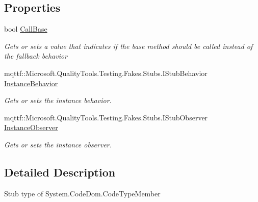 \subsection*{Properties}
\begin{DoxyCompactItemize}
\item 
bool \hyperlink{class_system_1_1_code_dom_1_1_fakes_1_1_stub_code_type_member_ad26ded313c73bfee43b33c5ba523671c}{Call\-Base}
\begin{DoxyCompactList}\small\item\em Gets or sets a value that indicates if the base method should be called instead of the fallback behavior\end{DoxyCompactList}\item 
mqttf\-::\-Microsoft.\-Quality\-Tools.\-Testing.\-Fakes.\-Stubs.\-I\-Stub\-Behavior \hyperlink{class_system_1_1_code_dom_1_1_fakes_1_1_stub_code_type_member_ace01653f0898203c907d35e0021ce587}{Instance\-Behavior}
\begin{DoxyCompactList}\small\item\em Gets or sets the instance behavior.\end{DoxyCompactList}\item 
mqttf\-::\-Microsoft.\-Quality\-Tools.\-Testing.\-Fakes.\-Stubs.\-I\-Stub\-Observer \hyperlink{class_system_1_1_code_dom_1_1_fakes_1_1_stub_code_type_member_a10c02c633674a6d8b1b86dfd82e434fe}{Instance\-Observer}
\begin{DoxyCompactList}\small\item\em Gets or sets the instance observer.\end{DoxyCompactList}\end{DoxyCompactItemize}


\subsection{Detailed Description}
Stub type of System.\-Code\-Dom.\-Code\-Type\-Member



